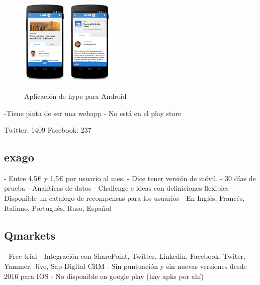 \begin{figure}[!h]
	\begin{center}
		\includegraphics[width=0.2\textwidth]{./img/competencia/hype/1.png}
		\includegraphics[width=0.2\textwidth]{./img/competencia/hype/2.png}
		\caption{Aplicación de hype para Android}
		\label{fig:hype}
	\end{center}
\end{figure}

-Tiene pinta de ser una webapp
- No está en el play store

Twitter: 1409
Facebook: 237

\subsection{exago}

- Entre 4,5€ y 1,5€ por usuario al mes.
- Dice tener versión de móvil.
- 30 días de prueba
- Analíticas de datos
- Challenge e ideas con definiciones flexibles
- Disponible un catalogo de recompensas para los usuarios
- En Inglés, Francés, Italiano, Portugués, Ruso, Español



\subsection{Qmarkets}

- Free trial
- Integración con SharePoint, Twitter, Linkedin, Facebook, Twiter, Yammer, Jive, Sap Digital CRM
- Sin puntuación y sin nuevas versiones desde 2016 para IOS
- No disponible en google play (hay apks por ahí)


